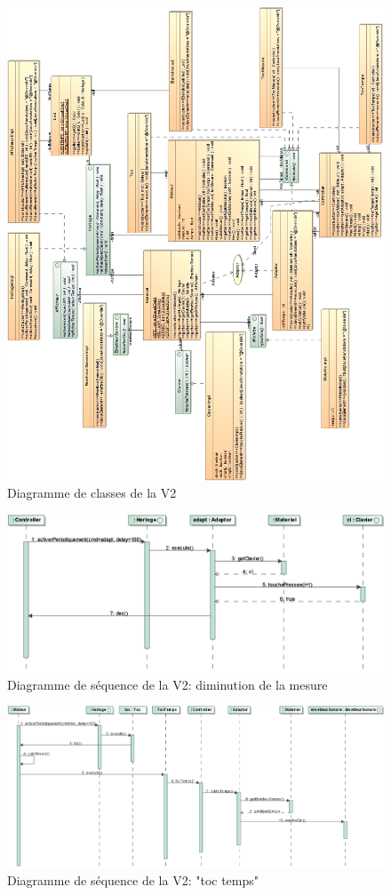 \documentclass{article}
\begin{document}
\begin{figure}[h]
   \caption{Diagramme de classes de la V2}
   \includegraphics[scale=0.75]{class_diagram_v2}
\end{figure}
\begin{figure}[h]
   \caption{Diagramme de séquence de la V2: diminution de la mesure}
   \includegraphics[scale=0.5]{seq_diagram_v2}
\end{figure}
\begin{figure}[h]
   \caption{Diagramme de séquence de la V2: "toc temps"}
   \includegraphics[scale=0.48]{seq_diagram_v2_2}
\end{figure}
\end{document}
